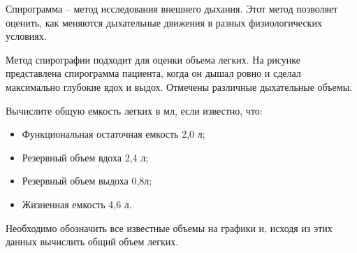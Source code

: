 
Спирограмма – метод исследования внешнего дыхания. Этот
метод позволяет оценить, как меняются дыхательные движения в разных
физиологических условиях. 

Метод спирографии подходит для
оценки объема легких. На рисунке представлена спирограмма пациента, когда он
дышал ровно и сделал максимально глубокие вдох и выдох. Отмечены различные
дыхательные объемы.


Вычислите общую емкость легких в мл, если известно, что:

\begin{itemize}
    \item Функциональная остаточная емкость 2,0 л;
    \item Резервный объем вдоха 2,4 л;
    \item Резервный объем выдоха 0,8л;
    \item Жизненная емкость 4,6 л.
\end{itemize}

\explanationSection

Необходимо обозначить все известные объемы на графики и, исходя из этих данных вычислить общий объем легких.

